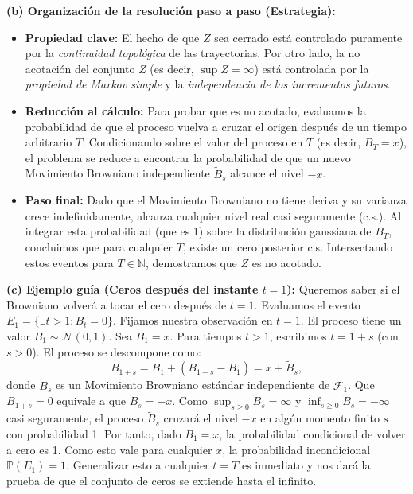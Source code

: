 \documentclass[11pt, letterpaper]{article}
\begin{document}
\begin{solucion}
    \textbf{(b) Organización de la resolución paso a paso (Estrategia):}
    \begin{itemize}
        \item[(i)] \textbf{Propiedad clave:} El hecho de que $Z$ sea cerrado está controlado puramente por la \textit{continuidad topológica} de las trayectorias. Por otro lado, la no acotación del conjunto $Z$ (es decir, $\sup Z = \infty$) está controlada por la \textit{propiedad de Markov simple} y la \textit{independencia de los incrementos futuros}.
        \item[(ii)] \textbf{Reducción al cálculo:} Para probar que es no acotado, evaluamos la probabilidad de que el proceso vuelva a cruzar el origen después de un tiempo arbitrario $T$. Condicionando sobre el valor del proceso en $T$ (es decir, $B_T = x$), el problema se reduce a encontrar la probabilidad de que un nuevo Movimiento Browniano independiente $\tilde{B}_s$ alcance el nivel $-x$.
        \item[(iii)] \textbf{Paso final:} Dado que el Movimiento Browniano no tiene deriva y su varianza crece indefinidamente, alcanza cualquier nivel real casi seguramente (c.s.). Al integrar esta probabilidad (que es 1) sobre la distribución gaussiana de $B_T$, concluimos que para cualquier $T$, existe un cero posterior c.s. Intersectando estos eventos para $T \in \mathbb{N}$, demostramos que $Z$ es no acotado.
    \end{itemize}

    \vspace{3mm}
    \textbf{(c) Ejemplo guía (Ceros después del instante $t=1$):}
    Queremos saber si el Browniano volverá a tocar el cero después de $t=1$. Evaluamos el evento $E_1 = \{ \exists t > 1 : B_t = 0 \}$. 
    Fijamos nuestra observación en $t=1$. El proceso tiene un valor $B_1 \sim \mathcal{N}(0,1)$. Sea $B_1 = x$.
    Para tiempos $t > 1$, escribimos $t = 1 + s$ (con $s > 0$). El proceso se descompone como:
    \[ B_{1+s} = B_1 + (B_{1+s} - B_1) = x + \tilde{B}_s, \]
    donde $\tilde{B}_s$ es un Movimiento Browniano estándar independiente de $\mathcal{F}_1$.
    Que $B_{1+s} = 0$ equivale a que $\tilde{B}_s = -x$. Como $\sup_{s \ge 0} \tilde{B}_s = \infty$ y $\inf_{s \ge 0} \tilde{B}_s = -\infty$ casi seguramente, el proceso $\tilde{B}_s$ cruzará el nivel $-x$ en algún momento finito $s$ con probabilidad 1. 
    Por tanto, dado $B_1 = x$, la probabilidad condicional de volver a cero es 1. Como esto vale para cualquier $x$, la probabilidad incondicional $\mathbb{P}(E_1) = 1$. Generalizar esto a cualquier $t=T$ es inmediato y nos dará la prueba de que el conjunto de ceros se extiende hasta el infinito.


\end{solucion}
\end{document}
